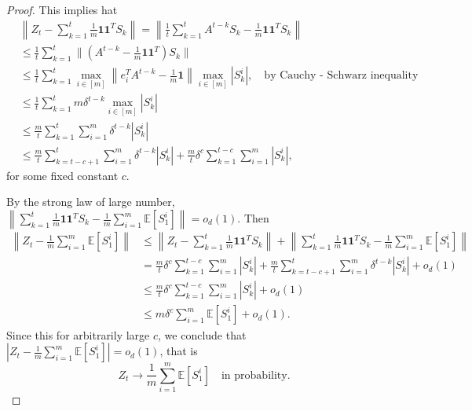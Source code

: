 \documentclass[twoside,11pt]{article}
\numberwithin{equation}{section}
\newcommand{\E}{\mathbb{E}}
\newcommand{\ones}{\mathbf{1}}
\begin{document}
{\begin{proof}
This implies hat
\begin{align*}
&\left\|Z_t  - \sum_{k = 1}^t \frac{1}{m} \ones \ones^T S_k \right\| = \left\|\frac{1}{t} \sum_{k = 1}^t A^{t-k} S_k - \frac{1}{m} \ones \ones^T S_k \right\| \\
&\leq \frac{1}{t} \sum_{k = 1}^t \|(A^{t-k} -\frac{1}{m} \ones \ones^T) S_k \| \\
&\leq \frac{1}{t} \sum_{k = 1}^t \max_{i \in [m]} \left\|e_i^T A^{t-k} - \frac{1}{m} \ones \right\| \max_{i \in [m]}|S_k^i|, \quad \text{by Cauchy - Schwarz inequality} \\
&\leq \frac{1}{t} \sum_{k = 1}^t  m \delta^{t-k} \max_{i \in [m]}|S_k^i| \\
&\leq \frac{m}{t} \sum_{k = 1}^t  \sum_{i = 1}^m  \delta^{t-k} |S_k^i| \\
&\leq \frac{m}{t} \sum_{k = t - c + 1}^t  \sum_{i = 1}^m  \delta^{t-k} |S_k^i|  +  \frac{m}{t} \delta^c \sum_{k = 1}^{t - c}  \sum_{i = 1}^m |S_k^i|, 
\end{align*}
for some fixed constant $c$. 

By the strong law of large number,  $\left\|\sum_{k = 1}^t \frac{1}{m} \ones \ones^T S_k - \frac{1}{m}  \sum_{i = 1}^m\E[S_1^i]\right\| = o_d(1)$.  Then
\begin{align*}
\left\|Z_t  - \frac{1}{m}  \sum_{i = 1}^m\E[S_1^i]\right\|  &\leq  \left\|Z_t  - \sum_{k = 1}^t \frac{1}{m} \ones \ones^T S_k \right\|  + \left\|\sum_{k = 1}^t \frac{1}{m} \ones \ones^T S_k  - \frac{1}{m}  \sum_{i = 1}^m\E[S_1^i]\right\| \\
 &=   \frac{m}{t} \delta^c \sum_{k = 1}^{t - c}  \sum_{i = 1}^m   |S_k^i| +\frac{m}{t} \sum_{k = t - c + 1}^t  \sum_{i = 1}^m  \delta^{t-k} |S_k^i| +o_d(1) \\
  &\leq   \frac{m}{t} \delta^c \sum_{k = 1}^{t - c}  \sum_{i = 1}^m   |S_k^i| +o_d(1) \\
&\leq   m \delta^c  \sum_{i = 1}^m\E[S_1^i]+o_d(1). 
\end{align*}
Since this for arbitrarily large $c$, we conclude that $ \left|Z_t  - \frac{1}{m}  \sum_{i = 1}^m\E[S_1^i]\right| = o_d(1)$, that is
\begin{equation*}
    Z_t \to \frac{1}{m}  \sum_{i = 1}^m\E[S_1^i] \quad \text{in probability}. 
\end{equation*}


\end{proof}}
\end{document}
